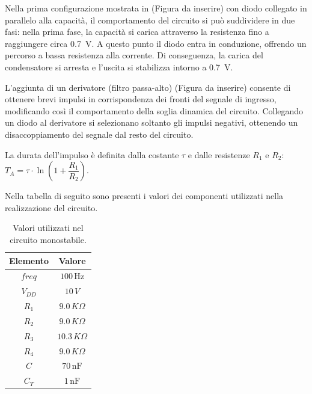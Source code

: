 \documentclass[a4paper,12pt]{article}
\begin{document}
Nella prima configurazione mostrata in (Figura da inserire) con diodo collegato in parallelo alla capacità, il comportamento del circuito si può suddividere in due fasi: nella prima fase, la capacità si carica attraverso la resistenza fino a raggiungere circa \SI{0.7}{\volt}.
A questo punto il diodo entra in conduzione, offrendo un percorso a bassa resistenza alla corrente.
Di conseguenza, la carica del condensatore si arresta e l’uscita si stabilizza intorno a \SI{0.7}{\volt}. 

L’aggiunta di un derivatore (filtro passa-alto) (Figura da inserire) consente di ottenere brevi impulsi in corrispondenza dei fronti del segnale di ingresso, modificando così il comportamento della soglia dinamica del circuito.
Collegando un diodo al derivatore si selezionano soltanto gli impulsi negativi, ottenendo un disaccoppiamento del segnale dal resto del circuito.

La durata dell'impulso è definita dalla costante $\tau$ e dalle resistenze $R_{1}$ e $R_{2}$:\\
$T_{A}=\tau\cdot\ln(1+\dfrac{R_{1}}{R_{2}})$.

Nella tabella di seguito sono presenti i valori dei componenti utilizzati nella realizzazione del circuito.
\begin{table}[h]
	\centering
	\setlength{\tabcolsep}{20pt}
	\begin{tabular}{c c}
		\toprule
		Elemento & Valore             \\
		\midrule
		$freq$   & $100\,\mathrm{Hz}$ \\
		$V_{DD}$ & $10\,V$            \\
		$R_1$    & $9.0\,K\Omega$     \\
		$R_2$    & $9.0\,K\Omega$     \\
		$R_3$    & $10.3\,K\Omega$    \\
		$R_4$    & $9.0\,K\Omega$     \\
		$C$      & $70\,\mathrm{nF}$  \\
		$C_T$    & $1\,\mathrm{nF}$   \\
		\bottomrule
	\end{tabular}
	\caption{Valori utilizzati nel circuito monostabile.}
	\label{tab:monostabile}
\end{table}
\end{document}
